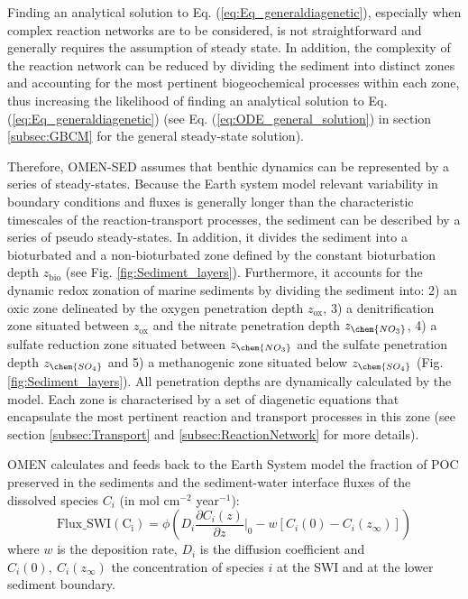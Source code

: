 \documentclass[gmd, manuscript]{copernicus}
\begin{document}
Finding an analytical solution to  Eq. (\ref{eq:Eq_generaldiagenetic}), especially when complex reaction networks are to be considered, is not straightforward and generally requires the assumption of steady state. 
In addition, the complexity of the reaction network can be reduced by dividing the sediment into distinct zones and accounting for the most pertinent biogeochemical processes 
within each zone, thus increasing the likelihood of finding an analytical solution to Eq. (\ref{eq:Eq_generaldiagenetic}) (see Eq. (\ref{eq:ODE_general_solution}) in section \ref{subsec:GBCM} for the general steady-state solution). 

Therefore, OMEN-SED assumes that benthic dynamics can be represented by a series of steady-states. 
Because the Earth system model relevant variability in boundary conditions and fluxes is generally longer than the characteristic timescales of the reaction-transport processes, the sediment can be described by a 
series of pseudo steady-states. In addition, it divides the sediment into a bioturbated and a non-bioturbated zone defined by the constant bioturbation depth $z_{\mathrm{bio}}$ (see Fig. \ref{fig:Sediment_layers}). 
Furthermore, it accounts for the dynamic redox zonation of marine sediments by dividing the sediment into: 2) an oxic zone delineated by the oxygen 
penetration depth $z_{\mathrm{ox}}$, 3) a denitrification zone situated between $z_{\mathrm{ox}}$ and the nitrate penetration depth $z_{\chem{NO_3}}$, 4) 
a sulfate reduction zone situated between $z_{\chem{NO_3}}$ and the sulfate penetration depth $z_{\chem{SO_4}}$ and 5) a methanogenic zone situated below $z_{\chem{SO_4}}$ (Fig. \ref{fig:Sediment_layers}). 
All penetration depths are dynamically calculated by the model. 
Each zone is characterised by a set of diagenetic equations that encapsulate the most pertinent reaction and transport processes in this zone (see section \ref{subsec:Transport} and \ref{subsec:ReactionNetwork} 
for more details). 

OMEN calculates and feeds back to the Earth System model the fraction of POC preserved in the sediments and the sediment-water interface fluxes of the dissolved species $C_i$ (in mol cm$^{-2}$ year$^{-1}$):
\begin{equation}
\mathrm{Flux\_SWI(C_i)} = \phi \left(D_i \frac{\partial C_i(z)}{\partial z}\bigg\rvert_0 - w \left[ C_i(0) - C_i(z_\infty) \right]\right)
\end{equation}
where $w$ is the deposition rate, $D_i$ is the diffusion coefficient and $C_i(0),\ C_i(z_\infty)$ the concentration of species $i$ at the SWI and at the lower sediment boundary. 
\end{document}
